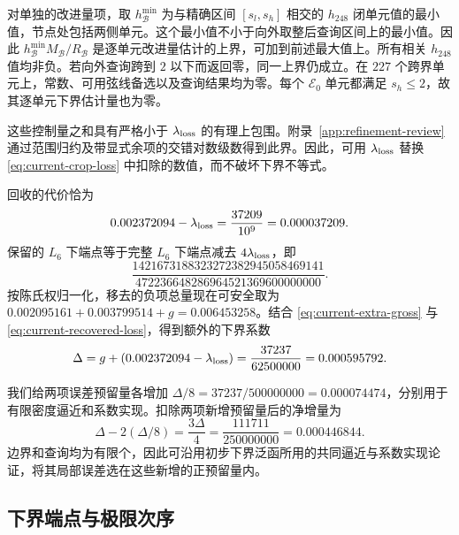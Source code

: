 对单独的改进量项，取 $h_{\mathscr B}^{\min}$ 为与精确区间 $[s_l,s_h]$ 相交的 $h_{248}$ 闭单元值的最小值，节点处包括两侧单元。这个最小值不小于向外取整后查询区间上的最小值。因此 $h_{\mathscr B}^{\min}M_{\mathscr B}/R_{\mathscr B}$ 是逐单元改进量估计的上界，可加到前述最大值上。所有相关 $h_{248}$ 值均非负。若向外查询跨到 $2$ 以下而返回零，同一上界仍成立。在 $227$ 个跨界单元上，常数、可用弦线备选以及查询结果均为零。每个 $\mathscr E_0$ 单元都满足 $s_h\le2$，故其逐单元下界估计量也为零。

这些控制量之和具有严格小于 $\lambda_{\rm loss}$ 的有理上包围。附录~\ref{app:refinement-review} 通过范围归约及带显式余项的交错对数级数得到此界。因此，可用 $\lambda_{\rm loss}$ 替换 \eqref{eq:current-crop-loss} 中扣除的数值，而不破坏下界不等式。

回收的代价恰为
\begin{equation}
 0.002372094-\lambda_{\rm loss}=\frac{37209}{10^9}=0.000037209.
 \label{eq:current-recovered-loss}
\end{equation}
保留的 $L_6$ 下端点等于完整 $L_6$ 下端点减去 $4\lambda_{\rm loss}$，即
\[
 \frac{1421673188323272382945058469141}
      {472236648286964521369600000000}.
\]
按陈氏权归一化，移去的负项总量现在可安全取为 $0.002095161+0.003799514+g=0.006453258$。结合 \eqref{eq:current-extra-gross} 与 \eqref{eq:current-recovered-loss}，得到额外的下界系数
\begin{equation}
 \Delta=g+(0.002372094-\lambda_{\rm loss})
 =\frac{37237}{62500000}=0.000595792.
 \label{eq:current-refinement-delta}
\end{equation}

我们给两项误差预留量各增加 $\Delta/8=37237/500000000=0.000074474$，分别用于有限密度逼近和系数实现。扣除两项新增预留量后的净增量为
\begin{equation}
 \Delta-2(\Delta/8)=\frac{3\Delta}{4}
                  =\frac{111711}{250000000}=0.000446844.
 \label{eq:current-refinement-net}
\end{equation}
边界和查询均为有限个，因此可沿用初步下界泛函所用的共同逼近与系数实现论证，将其局部误差选在这些新增的正预留量内。

\subsection{下界端点与极限次序}
\label{sec:lower-limits}

